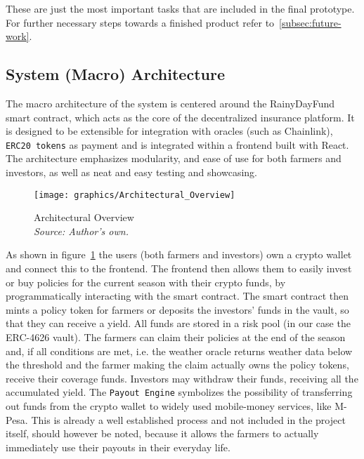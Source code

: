 \documentclass[11pt,a4paper]{article}
\begin{document}
		These are just the most important tasks that are included in the final prototype.
		For further necessary steps towards a finished product refer to~\ref{subsec:future-work}.


		\subsection{System (Macro) Architecture}\label{subsec:system-architecture}
		The macro architecture of the system is centered around the RainyDayFund smart contract, which acts as the core of the decentralized insurance platform.
		It is designed to be extensible for integration with oracles (such as Chainlink), \texttt{ERC20 tokens} as payment and is integrated within a frontend built with React.
		The architecture emphasizes modularity, and ease of use for both farmers and investors, as well as neat and easy testing and showcasing.

		\begin{figure}[htbp]
			\centering
			\texttt{[image: graphics/Architectural\_Overview]}
			\caption{Architectural Overview \\ \textit{Source: Author's own.}}
			\label{fig:architecture}
		\end{figure}

		As shown in figure~\ref{fig:architecture} the users (both farmers and investors) own a crypto wallet and connect this to the frontend.
		The frontend then allows them to easily invest or buy policies for the current season with their crypto funds, by programmatically interacting with the smart contract.
		The smart contract then mints a policy token for farmers or deposits the investors' funds in the vault, so that they can receive a yield.
		All funds are stored in a risk pool (in our case the ERC-4626 vault).
		The farmers can claim their policies at the end of the season and, if all conditions are met, i.e. the weather oracle returns weather data below the threshold and the farmer making the claim actually owns the policy tokens, receive their coverage funds.
		Investors may withdraw their funds, receiving all the accumulated yield.
		The \texttt{Payout Engine} symbolizes the possibility of transferring out funds from the crypto wallet to widely used mobile-money services, like M-Pesa.
		This is already a well established process and not included in the project itself, should however be noted, because it allows the farmers to actually immediately use their payouts in their everyday life.
\end{document}
